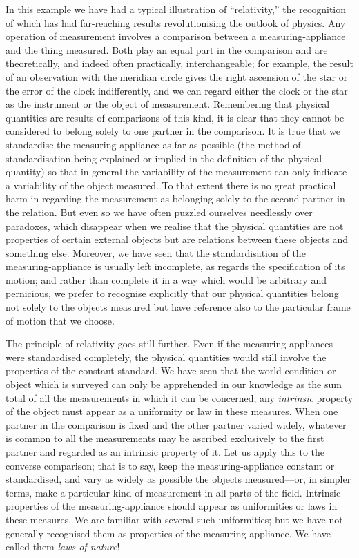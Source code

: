 \documentclass[12pt]{book}
\begin{document}
In this example we have had a typical illustration of ``relativity,'' the
%
recognition of which has had far-reaching results revolutionising the outlook
of physics. Any operation of measurement involves a comparison between
a measuring-appliance and the thing measured. Both play an equal part in
the comparison and are theoretically, and indeed often practically, interchangeable;
for example, the result of an observation with the meridian circle
gives the right ascension of the star or the error of the clock indifferently,
and we can regard either the clock or the star as the instrument or the
object of measurement. Remembering that physical quantities are results of
comparisons of this kind, it is clear that they cannot be considered to belong
solely to one partner in the comparison. It is true that we standardise the
measuring appliance as far as possible (the method of standardisation being
explained or implied in the definition of the physical quantity) so that in
general the variability of the measurement can only indicate a variability of
the object measured. To that extent there is no great practical harm in
regarding the measurement as belonging solely to the second partner in
the relation. But even so we have often puzzled ourselves needlessly over
paradoxes, which disappear when we realise that the physical quantities are
not properties of certain external objects but are relations between these
objects and something else. Moreover, we have seen that the standardisation
of the measuring-appliance is usually left incomplete, as regards the specification
of its motion; and rather than complete it in a way which would be
arbitrary and pernicious, we prefer to recognise explicitly that our physical
quantities belong not solely to the objects measured but have reference also
to the particular frame of motion that we choose.

The principle of relativity goes still further. Even if the measuring-appliances
were standardised completely, the physical quantities would still
involve the properties of the constant standard. We have seen that the
world-condition or object which is surveyed can only be apprehended in our
knowledge as the sum total of all the measurements in which it can be
concerned; any \emph{intrinsic} property of the object must appear as a uniformity
or law in these measures. When one partner in the comparison is fixed and
the other partner varied widely, whatever is common to all the measurements
may be ascribed exclusively to the first partner and regarded as an intrinsic
property of it. Let us apply this to the converse comparison; that is to say,
keep the measuring-appliance constant or standardised, and vary as widely
as possible the objects measured---or, in simpler terms, make a particular
kind of measurement in all parts of the field. Intrinsic properties of the
measuring-appliance should appear as uniformities or laws in these measures.
We are familiar with several such uniformities; but we have not generally
recognised them as properties of the measuring-appliance. We have called
them \emph{laws of nature}!
\end{document}
